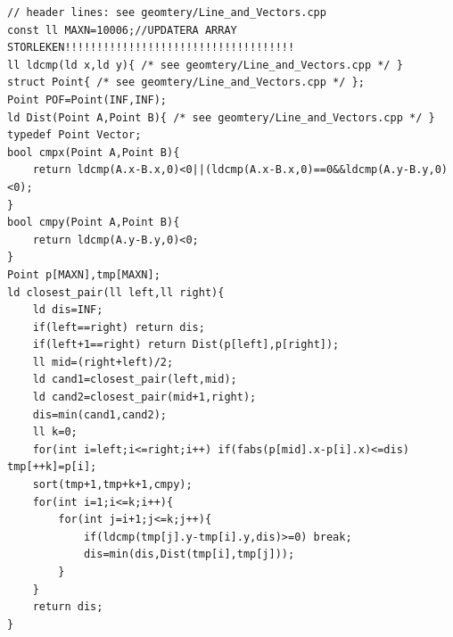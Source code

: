 \begin{lstlisting}[breaklines=true]
// header lines: see geomtery/Line_and_Vectors.cpp
const ll MAXN=10006;//UPDATERA ARRAY STORLEKEN!!!!!!!!!!!!!!!!!!!!!!!!!!!!!!!!!!!!
ll ldcmp(ld x,ld y){ /* see geomtery/Line_and_Vectors.cpp */ }
struct Point{ /* see geomtery/Line_and_Vectors.cpp */ };
Point POF=Point(INF,INF);
ld Dist(Point A,Point B){ /* see geomtery/Line_and_Vectors.cpp */ }
typedef Point Vector;
bool cmpx(Point A,Point B){
    return ldcmp(A.x-B.x,0)<0||(ldcmp(A.x-B.x,0)==0&&ldcmp(A.y-B.y,0)<0);
}
bool cmpy(Point A,Point B){
    return ldcmp(A.y-B.y,0)<0;
}
Point p[MAXN],tmp[MAXN];
ld closest_pair(ll left,ll right){
    ld dis=INF;
    if(left==right) return dis;
    if(left+1==right) return Dist(p[left],p[right]);
    ll mid=(right+left)/2;
    ld cand1=closest_pair(left,mid);
    ld cand2=closest_pair(mid+1,right);
    dis=min(cand1,cand2);
    ll k=0;
    for(int i=left;i<=right;i++) if(fabs(p[mid].x-p[i].x)<=dis) tmp[++k]=p[i];
    sort(tmp+1,tmp+k+1,cmpy);
    for(int i=1;i<=k;i++){
        for(int j=i+1;j<=k;j++){
            if(ldcmp(tmp[j].y-tmp[i].y,dis)>=0) break;
            dis=min(dis,Dist(tmp[i],tmp[j]));
        }
    }
    return dis;
}
\end{lstlisting}


